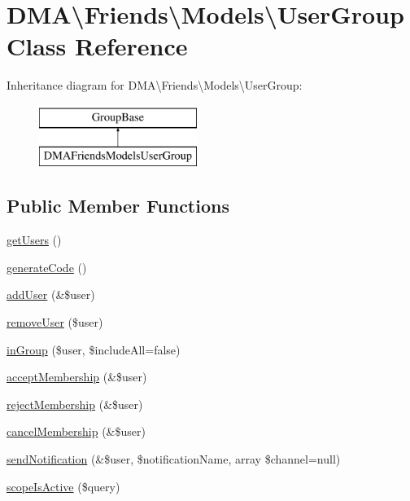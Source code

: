 \hypertarget{classDMA_1_1Friends_1_1Models_1_1UserGroup}{\section{D\+M\+A\textbackslash{}Friends\textbackslash{}Models\textbackslash{}User\+Group Class Reference}
\label{classDMA_1_1Friends_1_1Models_1_1UserGroup}
}
Inheritance diagram for D\+M\+A\textbackslash{}Friends\textbackslash{}Models\textbackslash{}User\+Group\+:\begin{figure}[H]
\begin{center}
\leavevmode
\includegraphics[height=2.000000cm]{d2/daf/classDMA_1_1Friends_1_1Models_1_1UserGroup}
\end{center}
\end{figure}
\subsection*{Public Member Functions}
\begin{DoxyCompactItemize}
\item 
\hyperlink{classDMA_1_1Friends_1_1Models_1_1UserGroup_a7f998f837a0bd734e0f1496f6902793f}{get\+Users} ()
\item 
\hyperlink{classDMA_1_1Friends_1_1Models_1_1UserGroup_af7f583bd7db92cfdc21eb4e5ed7bdabb}{generate\+Code} ()
\item 
\hyperlink{classDMA_1_1Friends_1_1Models_1_1UserGroup_a13eaffc2b414fe5dfd42aa6ac5fe75ca}{add\+User} (\&\$user)
\item 
\hyperlink{classDMA_1_1Friends_1_1Models_1_1UserGroup_ac08ee6038b5f0314c341123025484b91}{remove\+User} (\$user)
\item 
\hyperlink{classDMA_1_1Friends_1_1Models_1_1UserGroup_aab0755a408dcbff4a64277cd9032b9bf}{in\+Group} (\$user, \$include\+All=false)
\item 
\hyperlink{classDMA_1_1Friends_1_1Models_1_1UserGroup_ac55e9a0b178ed308374720c3dd9d7f90}{accept\+Membership} (\&\$user)
\item 
\hyperlink{classDMA_1_1Friends_1_1Models_1_1UserGroup_a09e0cf14a97b5618bd5db36dc320bf7e}{reject\+Membership} (\&\$user)
\item 
\hyperlink{classDMA_1_1Friends_1_1Models_1_1UserGroup_a0e21f8d83c3a53b9119fff9395da55a4}{cancel\+Membership} (\&\$user)
\item 
\hyperlink{classDMA_1_1Friends_1_1Models_1_1UserGroup_a4b341d8ba24955f26f2d0dc9d8dbc0ab}{send\+Notification} (\&\$user, \$notification\+Name, array \$channel=null)
\item 
\hyperlink{classDMA_1_1Friends_1_1Models_1_1UserGroup_af5985b34eee59820cb9ac6c28c01b725}{scope\+Is\+Active} (\$query)
\end{DoxyCompactItemize}
